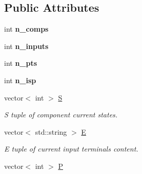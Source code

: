 \subsection*{Public Attributes}
\begin{DoxyCompactItemize}
\item 
int {\bfseries n\+\_\+comps}\hypertarget{class_behavior_state_aef4518fec5c81c14717024116848aef8}{}\label{class_behavior_state_aef4518fec5c81c14717024116848aef8}

\item 
int {\bfseries n\+\_\+inputs}\hypertarget{class_behavior_state_a317485b24596a361746c2e998b5cd5f8}{}\label{class_behavior_state_a317485b24596a361746c2e998b5cd5f8}

\item 
int {\bfseries n\+\_\+pts}\hypertarget{class_behavior_state_ae6daa12ac5ce1fc39ee33b4a01062dcc}{}\label{class_behavior_state_ae6daa12ac5ce1fc39ee33b4a01062dcc}

\item 
int {\bfseries n\+\_\+isp}\hypertarget{class_behavior_state_a6f51864a14defe8c8ddf624cdcd90be4}{}\label{class_behavior_state_a6f51864a14defe8c8ddf624cdcd90be4}

\item 
vector$<$ int $>$ \hyperlink{class_behavior_state_a9e74901f7f9b52884e6c77536a533c28}{S}\hypertarget{class_behavior_state_a9e74901f7f9b52884e6c77536a533c28}{}\label{class_behavior_state_a9e74901f7f9b52884e6c77536a533c28}

\begin{DoxyCompactList}\small\item\em S tuple of component current states. \end{DoxyCompactList}\item 
vector$<$ std\+::string $>$ \hyperlink{class_behavior_state_ad3db220485edc43dd0cfee1a9fed0b3a}{E}\hypertarget{class_behavior_state_ad3db220485edc43dd0cfee1a9fed0b3a}{}\label{class_behavior_state_ad3db220485edc43dd0cfee1a9fed0b3a}

\begin{DoxyCompactList}\small\item\em E tuple of current input terminals content. \end{DoxyCompactList}\item 
vector$<$ int $>$ \hyperlink{class_behavior_state_a18d6eb62b3da1d8ed7c81d8c046367dc}{P}\hypertarget{class_behavior_state_a18d6eb62b3da1d8ed7c81d8c046367dc}{}\label{class_behavior_state_a18d6eb62b3da1d8ed7c81d8c046367dc}


\end{DoxyCompactItemize}
